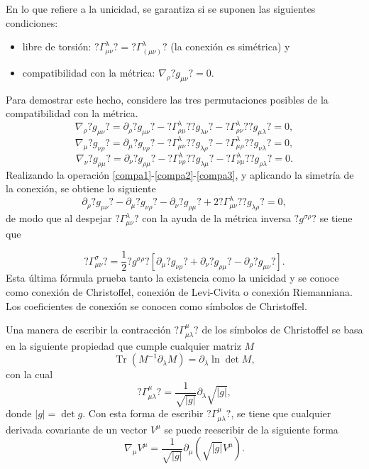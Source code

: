 En lo que refiere a la unicidad, se garantiza si se suponen las siguientes condiciones:
\begin{itemize}
	\item libre de torsión: $?\Gamma^\lambda_{\mu\nu}?=?\Gamma^\lambda_{(\mu\nu)}?$ (la conexión es simétrica) y
	\item compatibilidad con la métrica: $\nabla_\rho ?g_{\mu\nu}?=0.$
\end{itemize}
Para demostrar este hecho, considere las tres permutaciones posibles de la compatibilidad con la métrica.
\begin{equation}\label{compa1}
\nabla_\rho ?g_{\mu\nu}? =\partial_\rho?g_{\mu\nu}?-?\Gamma^\lambda_{\rho\mu}? ?g_{\lambda\nu}?-?\Gamma^\lambda_{\rho\nu}? ?g_{\mu\lambda}?=0,
\end{equation}
\begin{equation}\label{compa2}
\nabla_\mu ?g_{\nu\rho}? =\partial_\mu?g_{\nu\rho}?-?\Gamma^\lambda_{\mu\nu}? ?g_{\lambda\rho}?-?\Gamma^\lambda_{\mu\rho}? ?g_{\nu\lambda}?=0,
\end{equation}
\begin{equation}\label{compa3}
\nabla_\nu ?g_{\rho\mu}? =\partial_\nu?g_{\rho\mu}?-?\Gamma^\lambda_{\nu\rho}? ?g_{\lambda\mu}?-?\Gamma^\lambda_{\nu\mu}? ?g_{\rho\lambda}?=0.
\end{equation}
Realizando la operación \eqref{compa1}-\eqref{compa2}-\eqref{compa3}, y aplicando la simetría de la conexión, se obtiene lo siguiente
$$\partial_\rho ?g_{\mu\nu}?-\partial_\mu ?g_{\nu\rho}?-\partial_\nu ?g_{\rho\mu}?+2 ?\Gamma^\lambda_{\mu\nu}? ?g_{\lambda\rho}?=0,$$
de modo que al despejar $?\Gamma^\lambda_{\mu\nu}?$ con la ayuda de la métrica inversa $?g^{\sigma\rho}?$ se tiene que

\begin{equation}\label{conectionChristoffel}
?\Gamma^\sigma_{\mu\nu}?=\frac{1}{2}?g^{\sigma\rho}?[\partial_\mu ?g_{\nu\rho}?+\partial_\nu ?g_{\rho\mu}?-\partial_\rho ?g_{\mu\nu}?].
\end{equation}
Esta última fórmula prueba tanto la existencia como la unicidad y se conoce como conexión de Christoffel, conexión de Levi-Civita o conexión Riemanniana. Los coeficientes de conexión se conocen como símbolos de Christoffel.

Una manera de escribir la contracción $?\Gamma^\mu_{\mu\lambda}?$ de los símbolos de Christoffel se basa en la siguiente propiedad que cumple cualquier matriz $M$ \cite{bishop_goldberg_1980}
$$\mathop{Tr}(M^{-1}\partial_\lambda M)=\partial_\lambda \mathop{ln} \mathop{det} M,$$
con la cual
\begin{equation}
?\Gamma^\mu_{\mu\lambda}?=\frac{1}{\sqrt{|g|}}\partial_\lambda\sqrt{|g|},
\end{equation}
donde $|g|=\mathop{det}g.$ Con esta forma de escribir $?\Gamma^\mu_{\mu\lambda}?$, se tiene que cualquier derivada covariante de un vector $V^\mu$ se puede reescribir de la siguiente forma
\begin{equation}
\nabla_\mu V^\mu=\frac{1}{\sqrt{|g|}}\partial_\mu(\sqrt{|g|}V^\mu).
\end{equation}

